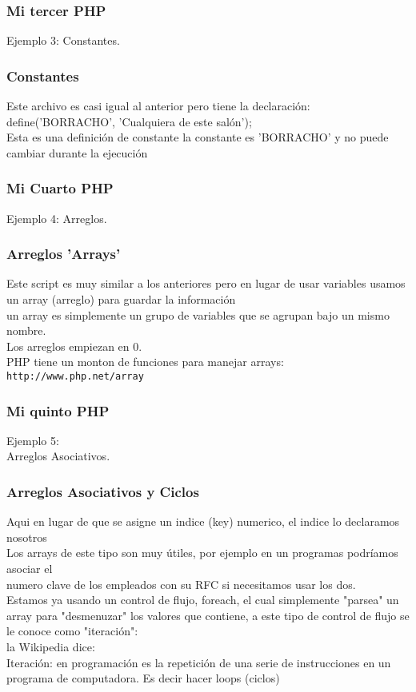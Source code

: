 \documentclass[]{beamer}
\begin{document}
\begin{frame}\frametitle{Mi tercer PHP}
Ejemplo 3:
Constantes.
\end{frame}

\begin{frame}\frametitle{Constantes}
Este archivo es casi igual al anterior pero tiene la declaración: define('BORRACHO', 'Cualquiera de este salón'); \\
Esta es una definición de constante la constante es 'BORRACHO' y no puede cambiar durante la ejecución \\
\end{frame}

\begin{frame}\frametitle{Mi Cuarto PHP}
Ejemplo 4:
Arreglos.
\end{frame}

\begin{frame}\frametitle{Arreglos 'Arrays'}
Este script es muy similar a los anteriores pero en lugar de usar variables usamos un array (arreglo) para guardar la información \\
un array es simplemente un grupo de variables que se agrupan bajo un mismo nombre. \\
Los arreglos empiezan en 0.\\

PHP tiene un monton de funciones para manejar arrays: \\
\texttt{http://www.php.net/array} \\
\end{frame}

\begin{frame}\frametitle{Mi quinto PHP}
Ejemplo 5: \\
Arreglos Asociativos.\\
\end{frame}

\begin{frame}\frametitle{Arreglos Asociativos y Ciclos}
Aqui en lugar de que se asigne un indice (key) numerico, el indice lo declaramos nosotros \\
Los arrays de este tipo son muy útiles, por ejemplo en un programas podríamos asociar el \\
numero clave de los empleados con su RFC si necesitamos usar los dos.\\
Estamos ya usando un control de flujo, foreach, el cual simplemente "parsea" un array para "desmenuzar" los valores que contiene, a este tipo de control de flujo se le conoce como "iteración": \\

la Wikipedia dice:\\

Iteración: en programación es la repetición de una serie de instrucciones en un programa de computadora. Es decir hacer loops (ciclos)\\
\end{frame}
\end{document}

